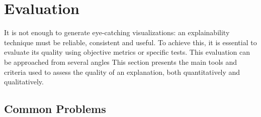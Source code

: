 \section{Evaluation}

It is not enough to generate eye-catching visualizations: an explainability technique must be reliable, consistent and useful. To achieve this, it is essential to evaluate its quality using objective metrics or specific tests. This evaluation can be approached from several angles This section presents the main tools and criteria used to assess the quality of an explanation, both quantitatively and qualitatively.

\subsection{Common Problems}

